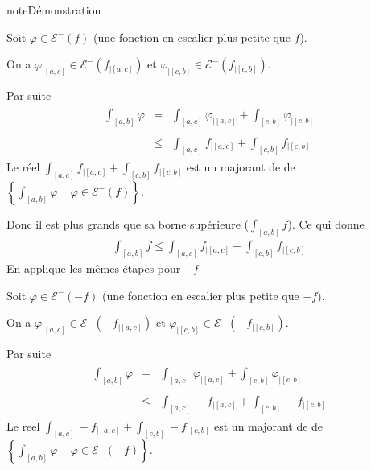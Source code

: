 \documentclass[letterpaper,10pt,french]{jupyterBook}
\begin{document}
\begin{sphinxadmonition}{note}{Démonstration}

\sphinxAtStartPar
Soit \(\varphi \in \mathcal E^-(f)\) (une fonction en escalier plus petite que \(f\)).

\sphinxAtStartPar
On a \(\varphi_{|[a, c]} \in \mathcal E^-(f_{|[a, c]})\) et \(\varphi_{|[c, b]} \in \mathcal E^-(f_{|[c, b]})\).

\sphinxAtStartPar
Par suite
\begin{equation*}
\begin{split}
\begin{aligned}
\int_{[a, b]}\varphi &=& \int_{[a, c]} \varphi_{|[a, c]} + \int_{[c, b]} \varphi_{|[c, b]} \\ \\
&\leq& \int_{[a, c]} f_{|[a, c]} + \int_{[c, b]} f_{|[c, b]}
\end{aligned}
\end{split}
\end{equation*}
\sphinxAtStartPar
Le réel \(\int_{[a, c]} f_{|[a, c]} + \int_{[c, b]} f_{|[c, b]}\) est un majorant de de \(\left\{\int_{[a, b]}\varphi ~~|~~ \varphi \in \mathcal E^-(f) \right\}\).

\sphinxAtStartPar
Donc il est plus grands que sa borne supérieure (\(\int_{[a, b]} f\)).
Ce qui donne
\begin{equation*}
\begin{split}
\int_{[a, b]} f \leq \int_{[a, c]} f_{|[a, c]} + \int_{[c, b]} f_{|[c, b]}
\end{split}
\end{equation*}
\sphinxAtStartPar
En applique les mêmes étapes pour \(-f\)

\sphinxAtStartPar
Soit \(\varphi \in \mathcal E^-(-f)\) (une fonction en escalier plus petite que \(-f\)).

\sphinxAtStartPar
On a \(\varphi_{|[a, c]} \in \mathcal E^-(-f_{|[a, c]})\) et \(\varphi_{|[c, b]} \in \mathcal E^-(-f_{|[c, b]})\).

\sphinxAtStartPar
Par suite
\begin{equation*}
\begin{split}
\begin{aligned}
\int_{[a, b]}\varphi &=& \int_{[a, c]} \varphi_{|[a, c]} + \int_{[c, b]} \varphi_{|[c, b]} \\ \\
&\leq& \int_{[a, c]} -f_{|[a, c]} + \int_{[c, b]} -f_{|[c, b]}
\end{aligned}
\end{split}
\end{equation*}
\sphinxAtStartPar
Le reel \(\int_{[a, c]} -f_{|[a, c]} + \int_{[c, b]} -f_{|[c, b]}\) est un majorant de de \(\left\{\int_{[a, b]}\varphi ~~|~~ \varphi \in \mathcal E^-(-f) \right\}\).


\end{sphinxadmonition}
\end{document}
